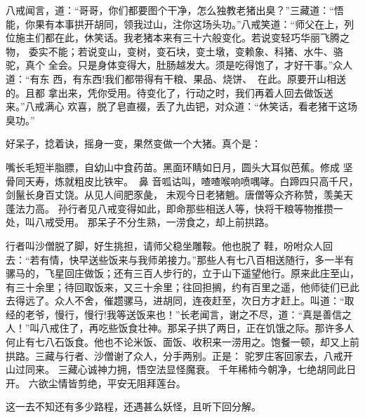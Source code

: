 八戒闻言，道：“哥哥，你们都要图个干净，怎么独教老猪出臭？”三藏道：“悟
能，你果有本事拱开胡同，领我过山，注你这场头功。”八戒笑道：“师父在上，列
位施主们都在此，休笑话。我老猪本来有三十六般变化。若说变轻巧华丽飞腾之物，
委实不能；若说变山，变树，变石块，变土墩，变赖象、科猪、水牛、骆驼，真个
全会。只是身体变得大，肚肠越发大。须是吃得饱了，才好干事。”众人道：“有东
西，有东西!我们都带得有干粮、果品、烧饼、在此。原要开山相送的。且都
拿出来，凭你受用。待变化了，行动之时，我们再着人回去做饭送来。”八戒满心
欢喜，脱了皂直裰，丢了九齿钯，对众道：“休笑话，看老猪干这场臭功。”

好呆子，捻着诀，摇身一变，果然变做一个大猪。真个是：

嘴长毛短半脂膘，自幼山中食药苗。黑面环睛如日月，圆头大耳似芭蕉。修成
坚骨同天寿，炼就粗皮比铁牢。鼻
音呱诂叫，喳喳喉响喷喁哮。白蹄四只高千尺，剑鬣长身百丈饶。从见人间肥豕彘，
未观今日老猪魈。唐僧等众齐称赞，羡美天蓬法力高。
孙行者见八戒变得如此，即命那些相送人等，快将干粮等物推攒一处，叫八戒受用。
那呆子不分生熟，一涝食之，却上前拱路。

行者叫沙僧脱了脚，好生挑担，请师父稳坐雕鞍。他也脱了鞋，吩咐众人回
去：“若有情，快早送些饭来与我师弟接力。”那些人有七八百相送随行，多一半有
骡马的，飞星回庄做饭；还有三百人步行的，立于山下遥望他行。原来此庄至山，
有三十余里；待回取饭来，又三十余里；往回担搁，约有百里之遥，他师徒们已此
去得远了。众人不舍，催趱骡马，进胡同，连夜赶至，次日方才赶上。叫道：“取
经的老爷，慢行，慢行!我等送饭来也！”长老闻言，谢之不尽，道：“真是善信之
人！”叫八戒住了，再吃些饭食壮神。那呆子拱了两日，正在饥饿之际。那许多人
何止有七八石饭食。他也不论米饭、面饭、收积来一涝用之。饱餐一顿，却又上前
拱路。三藏与行者、沙僧谢了众人，分手两别。正是：
驼罗庄客回家去，八戒开山过同来。
三藏心诚神力拥，悟空法显怪魔衰。
千年稀柿今朝净，七绝胡同此日开。
六欲尘情皆剪绝，平安无阻拜莲台。

这一去不知还有多少路程，还遇甚么妖怪，且听下回分解。